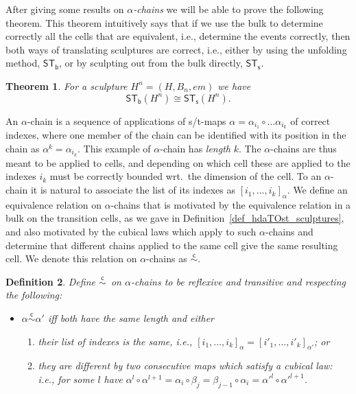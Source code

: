 \documentclass[submission,copyright,creativecommons]{eptcs}
\newtheorem{theorem}{Theorem}[section]
\newtheorem{definition}[theorem]{Definition}
\newcommand\isomorphic{\ensuremath{\cong}}
\newcommand\sculpintost{\ensuremath{\mathsf{ST}_{\!\mathsf{s}}}}
\newcommand\hintostScultures{\ensuremath{\mathsf{ST}_{\!\mathsf{b}}}}
\newcommand\sculpture[2]{\ensuremath{#1^{#2}}}
\newcommand\embedMorphism{\ensuremath{\mathit{em}}}
\newcommand\chainEquivHDAsculpture{\ensuremath{\overset{\mathsf{c}}{\sim}}}
\begin{document}
After giving some results on \textit{$\alpha$-chains} we will be able to prove the following theorem.
This theorem intuitively says that if we use the bulk to determine correctly all the cells that are equivalent, i.e., determine the events correctly, then both ways of translating sculptures are correct, i.e., either by using the unfolding method, $\hintostScultures$, or by sculpting out from the bulk directly, \sculpintost.

\begin{theorem}\label{th_on_scultures}
For a sculpture $\sculpture{H}{n}=(H,B_{n},\embedMorphism)$ we have
\[
\hintostScultures(\sculpture{H}{n})\isomorphic \sculpintost(\sculpture{H}{n}).
\]
\end{theorem}


An $\alpha$-chain is a sequence of applications of s/t-maps $\alpha=\alpha_{i_{1}}\circ\dots\alpha_{i_{k}}$ of correct indexes, where one member of the chain can be identified with its position in the chain as $\alpha^{k}=\alpha_{i_{k}}$. This example of $\alpha$-chain has \emph{length} $k$. The $\alpha$-chains are thus meant to be applied to cells, and depending on which cell these are applied to the indexes $i_{k}$ must be correctly bounded wrt.\ the dimension of the cell. To an $\alpha$-chain it is natural to associate the list of its indexes as $[i_{1},\dots,i_{k}]_{\alpha}$. We define an equivalence relation on $\alpha$-chains that is motivated by the equivalence relation in a bulk on the transition cells, as we gave in Definition~\ref{def_hdaTOst_sculptures}, and also motivated by the cubical laws which apply to such $\alpha$-chains and determine that different chains applied to the same cell give the same resulting cell. We denote this relation on $\alpha$-chains as \chainEquivHDAsculpture.

\begin{definition}
Define \chainEquivHDAsculpture\ on $\alpha$-chains to be reflexive and transitive and respecting the following:
\begin{itemize}
\item[] $\alpha\chainEquivHDAsculpture\alpha'$ iff both have the same length and either
\begin{enumerate}
\item their list of indexes is the same, i.e., $[i_{1},\dots,i_{k}]_{\alpha}=[i'_{1},\dots,i'_{k}]_{\alpha'}$; or


\item they are different by two consecutive maps which satisfy a cubical law: i.e., for some $l$ have $\alpha^{l}\circ\alpha^{l+1}=\alpha_{i}\circ\beta_{j}=\beta_{j-1}\circ\alpha_{i}=\alpha'^{l}\circ\alpha'^{l+1}$.
\end{enumerate}
\end{itemize}
\end{definition}
\end{document}
